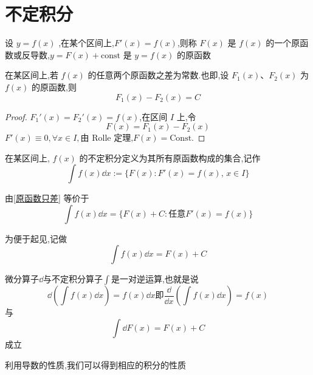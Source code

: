 \section{不定积分}
\begin{definition}
	设 \( y = f(x) \) ,在某个区间上,\( F'(x) = f(x) \),则称 \( F(x) \) 是 \( f(x) \) 的一个原函数或反导数,\( y = F(x) + \text{const} \) 是 \( y = f(x) \) 的原函数
	
\end{definition}
\begin{proposition}\label{原函数只差}
	在某区间上,若 \( f(x) \) 的任意两个原函数之差为常数.也即,设 \( F_1(x) \)、\( F_2(x) \) 为 \( f(x) \) 的原函数,则
	\[
	F_1(x) - F_2(x) = C
	\]
	
	
	
\end{proposition}
\begin{proof}
	\( F_1'(x) = F_2'(x) = f(x) \),在区间 \( I \) 上,令
	\[
	F(x) = F_1(x) - F_2(x)
	\]
	$
	F'(x) \equiv 0, \forall x \in I, \text{由 Rolle 定理,} F(x) = \text{Const.}$
\end{proof}
\begin{definition}
	在某区间上, \( f(x) \) 的不定积分定义为其所有原函数构成的集合,记作
	\[
	\int f(x) \dd x := \{ F(x) : F'(x) = f(x), \, x \in I \}
	\]
	
	由\ref{原函数只差} 等价于
	\[
	\int f(x) \dd x = \{ F(x) + C : \text{任意} F'(x) = f(x) \}
	\]
	
	为便于起见,记做
	\[
	\int f(x) \dd x = F(x) + C\]
	
\end{definition}
微分算子$\dd$与不定积分算子$\int$是一对逆运算,也就是说
$$\dd(\int f(x)\dd x)=f(x)\dd x\text{即}\dfrac{\dd}{\dd x}(\int f(x)\dd x)=f(x)$$
与$$\int\dd F(x)=F(x)+C$$成立

利用导数的性质,我们可以得到相应的积分的性质

